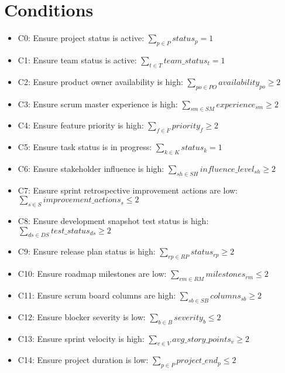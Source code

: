 \documentclass{article}
\begin{document}
\section{Conditions}
\begin{itemize}
    \item C0: Ensure project status is active: $\sum_{p \in P} status_p = 1$
    \item C1: Ensure team status is active: $\sum_{t \in T} team\_status_t = 1$
    \item C2: Ensure product owner availability is high: $\sum_{po \in PO} availability_{po} \geq 2$
    \item C3: Ensure scrum master experience is high: $\sum_{sm \in SM} experience_{sm} \geq 2$
    \item C4: Ensure feature priority is high: $\sum_{f \in F} priority_f \geq 2$
    \item C5: Ensure task status is in progress: $\sum_{k \in K} status_k = 1$
    \item C6: Ensure stakeholder influence is high: $\sum_{sh \in SH} influence\_level_{sh} \geq 2$
    \item C7: Ensure sprint retrospective improvement actions are low: $\sum_{s \in S} improvement\_actions_s \leq 2$
    \item C8: Ensure development snapshot test status is high: $\sum_{ds \in DS} test\_status_{ds} \geq 2$
    \item C9: Ensure release plan status is high: $\sum_{rp \in RP} status_{rp} \geq 2$
    \item C10: Ensure roadmap milestones are low: $\sum_{rm \in RM} milestones_{rm} \leq 2$
    \item C11: Ensure scrum board columns are high: $\sum_{sb \in SB} columns_{sb} \geq 2$
    \item C12: Ensure blocker severity is low: $\sum_{b \in B} severity_b \leq 2$
    \item C13: Ensure sprint velocity is high: $\sum_{v \in V} avg\_story\_points_v \geq 2$
    \item C14: Ensure project duration is low: $\sum_{p \in P} project\_end_p \leq 2$
\end{itemize}
\end{document}

